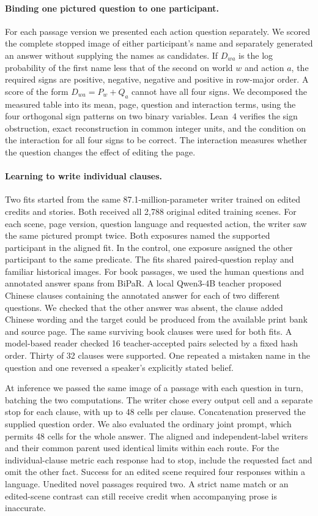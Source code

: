 \paragraph{Binding one pictured question to one participant.}
For each passage version we presented each action question separately. We scored the complete stopped image of either participant's name and separately generated an answer without supplying the names as candidates. If $D_{wa}$ is the log probability of the first name less that of the second on world $w$ and action $a$, the required signs are positive, negative, negative and positive in row-major order. A score of the form $D_{wa}=P_w+Q_a$ cannot have all four signs. We decomposed the measured table into its mean, page, question and interaction terms, using the four orthogonal sign patterns on two binary variables. Lean~4 verifies the sign obstruction, exact reconstruction in common integer units, and the condition on the interaction for all four signs to be correct. The interaction measures whether the question changes the effect of editing the page.

\paragraph{Learning to write individual clauses.}
Two fits started from the same 87.1-million-parameter writer trained on edited credits and stories. Both received all 2,788 original edited training scenes. For each scene, page version, question language and requested action, the writer saw the same pictured prompt twice. Both exposures named the supported participant in the aligned fit. In the control, one exposure assigned the other participant to the same predicate. The fits shared paired-question replay and familiar historical images. For book passages, we used the human questions and annotated answer spans from BiPaR. A local Qwen3-4B teacher proposed Chinese clauses containing the annotated answer for each of two different questions. We checked that the other answer was absent, the clause added Chinese wording and the target could be produced from the available print bank and source page. The same surviving book clauses were used for both fits. A model-based reader checked 16 teacher-accepted pairs selected by a fixed hash order. Thirty of 32 clauses were supported. One repeated a mistaken name in the question and one reversed a speaker's explicitly stated belief.

At inference we passed the same image of a passage with each question in turn, batching the two computations. The writer chose every output cell and a separate stop for each clause, with up to 48 cells per clause. Concatenation preserved the supplied question order. We also evaluated the ordinary joint prompt, which permits 48 cells for the whole answer. The aligned and independent-label writers and their common parent used identical limits within each route. For the individual-clause metric each response had to stop, include the requested fact and omit the other fact. Success for an edited scene required four responses within a language. Unedited novel passages required two. A strict name match or an edited-scene contrast can still receive credit when accompanying prose is inaccurate.

